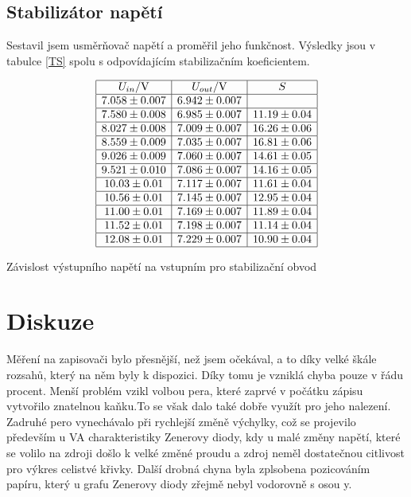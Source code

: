 \documentclass[a4paper,12pt]{article}
\begin{document}
\subsection{Stabilizátor napětí}
Sestavil jsem usměrňovač napětí a proměřil jeho funkčnost. Výsledky jsou v tabulce \ref{TS} spolu 
s odpovídajícím stabilizačním koeficientem.
\begin{table}
$$
\begin{array}{|c|c|c|}
\hline
U_{in}/\mbox{V}&    U_{out}/\mbox{V}&   S \\ \hline
7.058 \pm 0.007&   6.942 \pm 0.007&  \\ \hline
7.580 \pm 0.008&   6.985 \pm 0.007& 11.19 \pm 0.04 \\ \hline
8.027 \pm 0.008&  7.009 \pm 0.007&  16.26 \pm 0.06 \\ \hline
8.559 \pm 0.009&   7.035 \pm 0.007& 16.81 \pm 0.06 \\ \hline
9.026 \pm 0.009&   7.060 \pm 0.007& 14.61 \pm 0.05 \\ \hline
9.521 \pm 0.010&  7.086 \pm 0.007&  14.16 \pm 0.05 \\ \hline
10.03 \pm 0.01&  7.117\pm 0.007&    11.61 \pm 0.04 \\ \hline
10.56 \pm 0.01& 7.145\pm 0.007&     12.95 \pm 0.04 \\ \hline
11.00 \pm 0.01& 7.169 \pm 0.007&    11.89 \pm 0.04 \\ \hline
11.52 \pm 0.01&  7.198 \pm 0.007&   11.14 \pm 0.04 \\ \hline
12.08 \pm 0.01& 7.229\pm 0.007&     10.90 \pm 0.04 \\ \hline
\end{array}
$$
\caption{Závislost výstupního napětí na vstupním pro stabilizační obvod}
\label{TS}
\end{table}

\section{Diskuze}
Měření na zapisovači bylo přesnější, než jsem očekával, a to díky velké škále rozsahů, který na něm byly k dispozici. 
Díky tomu je vzniklá chyba pouze v řádu procent. Menší problém vzikl volbou pera, které zaprvé v počátku zápisu vytvořilo 
znatelnou kaňku.To se však dalo také dobře využít pro jeho nalezení. Zadruhé pero vynechávalo při rychlejší změně výchylky, 
což se projevilo především u VA charakteristiky Zenerovy diody, kdy u malé změny napětí, které se volilo na zdroji došlo k 
velké změné proudu a zdroj neměl dostatečnou citlivost pro výkres celistvé křivky. Další drobná chyna byla zplsobena pozicováním 
papíru, který u grafu Zenerovy diody zřejmě nebyl vodorovně s osou y.
\end{document}
